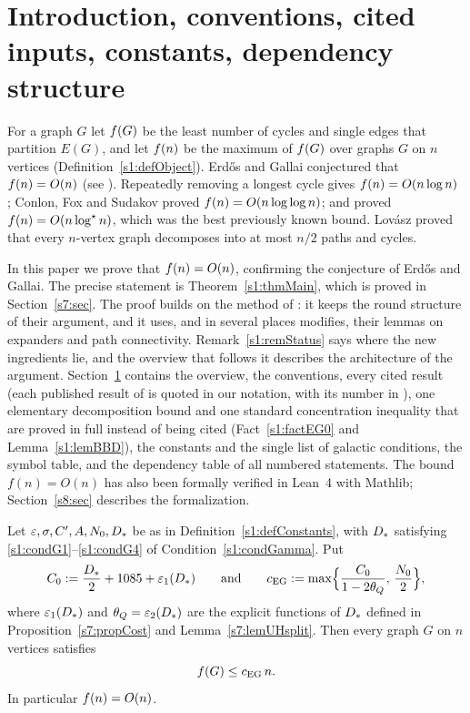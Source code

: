 \section{Introduction, conventions, cited inputs, constants, dependency structure}\label{s1:sec}

For a graph $G$ let $f(G)$ be the least number of cycles and single edges that
partition $E(G)$, and let $f(n)$ be the maximum of $f(G)$ over graphs $G$ on
$n$ vertices (Definition~\ref{s1:defObject}). Erd\H{o}s and Gallai
conjectured that $f(n)=O(n)$ (see \cite{EG66}). Repeatedly removing a longest cycle gives
$f(n)=O(n\log n)$ \cite{EG66}; Conlon, Fox and Sudakov \cite{CFS14} proved
$f(n)=O(n\log\log n)$; and \BMnames{} \cite{BM} proved $f(n)=O(n\log^{\star} n)$,
which was the best previously known bound. Lov\'asz \cite{Lov68} proved that every
$n$-vertex graph decomposes into at most $n/2$ paths and cycles.

In this paper we prove that $f(n)=O(n)$, confirming the conjecture of
Erd\H{o}s and Gallai. The precise statement is Theorem~\ref{s1:thmMain}, which
is proved in Section~\ref{s7:sec}. The proof builds on the method of \BMnames{}
\cite{BM}: it keeps the round structure of their argument, and it uses, and in
several places modifies, their lemmas on expanders and path connectivity.
Remark~\ref{s1:remStatus} says where the new ingredients lie, and the overview
that follows it describes the architecture of the argument.
Section~\ref{s1:sec} contains the overview, the conventions, every cited result
(each published result of \cite{BM} is quoted in our notation, with its number in
\cite{BM}), one elementary decomposition bound and one standard concentration
inequality that are proved in full instead of being cited (Fact~\ref{s1:factEG0}
and Lemma~\ref{s1:lemBBD}), the constants and the single list of galactic
conditions, the symbol table, and the dependency table of all numbered
statements. The bound $f(n)=O(n)$ has also been formally verified in Lean~4 with Mathlib;
Section~\ref{s8:sec} describes the formalization.

\begin{theorem}\label{s1:thmMain}
Let $\varepsilon,\sigma,C',A,N_{0},D_{*}$ be as in
Definition~\ref{s1:defConstants}, with $D_{*}$ satisfying
\ref{s1:condG1}--\ref{s1:condG4} of Condition~\ref{s1:condGamma}. Put
\[
C_{0}\mathrel{:=} \frac{D_{*}}{2}+1085+\varepsilon_{1}(D_{*})
\qquad\text{and}\qquad
c_{\mathrm{EG}}\mathrel{:=}\max\Bigl\{\frac{C_{0}}{1-2\theta_{Q}},\,\frac{N_{0}}{2}\Bigr\},
\]
where $\varepsilon_{1}(D_{*})$ and $\theta_{Q}=\varepsilon_{2}(D_{*})$ are the explicit functions
of $D_{*}$ defined in Proposition~\ref{s7:propCost} and
Lemma~\ref{s7:lemUHsplit}. Then every graph $G$ on $n$ vertices satisfies
\[
f(G)\le c_{\mathrm{EG}}\, n .
\]
In particular $f(n)=O(n)$.
\end{theorem}

